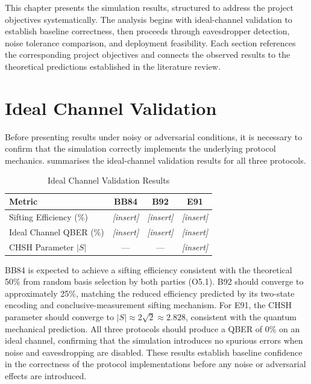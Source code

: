 \documentclass[10pt, a4paper]{report}
\begin{document}
This chapter presents the simulation results, structured to address the project objectives systematically. The analysis begins with ideal-channel validation to establish baseline correctness, then proceeds through eavesdropper detection, noise tolerance comparison, and deployment feasibility. Each section references the corresponding project objectives and connects the observed results to the theoretical predictions established in the literature review.


\section{Ideal Channel Validation}

Before presenting results under noisy or adversarial conditions, it is necessary to confirm that the simulation correctly implements the underlying protocol mechanics.  summarises the ideal-channel validation results for all three protocols.

\begin{table}[ht]
    \centering
    \caption{Ideal Channel Validation Results}
    \label{tab:validation}
    \begin{tabular}{l c c c}
        \toprule
        \textbf{Metric} & \textbf{BB84} & \textbf{B92} & \textbf{E91} \\
        \midrule
        Sifting Efficiency (\%) & \textit{[insert]} & \textit{[insert]} & \textit{[insert]} \\
        Ideal Channel QBER (\%) & \textit{[insert]} & \textit{[insert]} & \textit{[insert]} \\
        CHSH Parameter $|S|$ & --- & --- & \textit{[insert]} \\
        \bottomrule
    \end{tabular}
\end{table}

BB84 is expected to achieve a sifting efficiency consistent with the theoretical 50\% from random basis selection by both parties (O5.1). B92 should converge to approximately 25\%, matching the reduced efficiency predicted by its two-state encoding and conclusive-measurement sifting mechanism. For E91, the CHSH parameter should converge to $|S| \approx 2\sqrt{2} \approx 2.828$, consistent with the quantum mechanical prediction. All three protocols should produce a QBER of 0\% on an ideal channel, confirming that the simulation introduces no spurious errors when noise and eavesdropping are disabled. These results establish baseline confidence in the correctness of the protocol implementations before any noise or adversarial effects are introduced.
\end{document}
